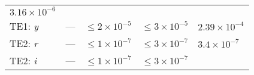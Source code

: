 \documentclass[DM,lsstdraft,toc]{lsstdoc}
\begin{document}
\begin{longtable}[]{@{}lllll@{}}
\begin{minipage}[t]{0.22\columnwidth}
\(3.16\times 10^{-6}\)\strut
\end{minipage}\tabularnewline
\begin{minipage}[t]{0.13\columnwidth}\raggedright\strut
TE1: \emph{y}\strut
\end{minipage} & \begin{minipage}[t]{0.05\columnwidth}\raggedright\strut
---\strut
\end{minipage} & \begin{minipage}[t]{0.24\columnwidth}\raggedright\strut
\(\leq 2\times 10^{-5}\)\strut
\end{minipage} & \begin{minipage}[t]{0.21\columnwidth}\raggedright\strut
\(\leq 3\times 10^{-5}\)\strut
\end{minipage} & \begin{minipage}[t]{0.22\columnwidth}\raggedright\strut
\(2.39\times 10^{-4}\)\strut
\end{minipage}\tabularnewline
\begin{minipage}[t]{0.13\columnwidth}\raggedright\strut
TE2: \emph{r}\strut
\end{minipage} & \begin{minipage}[t]{0.05\columnwidth}\raggedright\strut
---\strut
\end{minipage} & \begin{minipage}[t]{0.24\columnwidth}\raggedright\strut
\(\leq 1\times 10^{-7}\)\strut
\end{minipage} & \begin{minipage}[t]{0.21\columnwidth}\raggedright\strut
\(\leq 3\times 10^{-7}\)\strut
\end{minipage} & \begin{minipage}[t]{0.22\columnwidth}\raggedright\strut
\(3.4\times 10^{-7}\)\strut
\end{minipage}\tabularnewline
\begin{minipage}[t]{0.13\columnwidth}\raggedright\strut
TE2: \emph{i}\strut
\end{minipage} & \begin{minipage}[t]{0.05\columnwidth}\raggedright\strut
---\strut
\end{minipage} & \begin{minipage}[t]{0.24\columnwidth}\raggedright\strut
\(\leq 1\times 10^{-7}\)\strut
\end{minipage} & \begin{minipage}[t]{0.21\columnwidth}\raggedright\strut
\(\leq 3\times 10^{-7}\)\strut
\end{minipage} & \begin{minipage}[t]{0.22\columnwidth}\raggedright\strut

\end{minipage}
\end{longtable}
\end{document}
